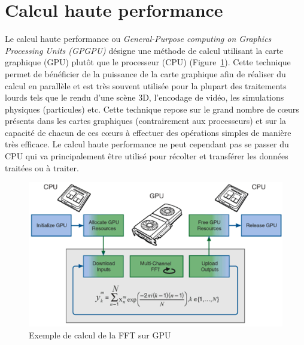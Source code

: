 \section{Calcul haute performance}
Le calcul haute performance\cite{sanders2010cuda} ou \emph{General-Purpose computing on Graphics Processing Units (GPGPU)} désigne une méthode de calcul utilisant la carte graphique (GPU) plutôt que le processeur (CPU) (Figure~\ref{fig:gpgpu}). Cette technique permet de bénéficier de la puissance de la carte graphique afin de réaliser du calcul en parallèle et est très souvent utilisée pour la plupart des traitements lourds tels que le rendu d'une scène 3D, l'encodage de vidéo, les simulations physiques (particules) etc. Cette technique repose sur le grand nombre de cœurs présents dans les cartes graphiques (contrairement aux processeurs) et sur la capacité de chacun de ces cœurs à effectuer des opérations simples de manière très efficace. Le calcul haute performance ne peut cependant pas se passer du CPU qui va principalement être utilisé pour récolter et transférer les données traitées ou à traiter.

\begin{figure}[H]
\centering
\includegraphics[scale=0.7]{images/gpuworkflow}
\caption{Exemple de calcul de la FFT sur GPU\protect\footnotemark}
\label{fig:gpgpu}
\end{figure}
